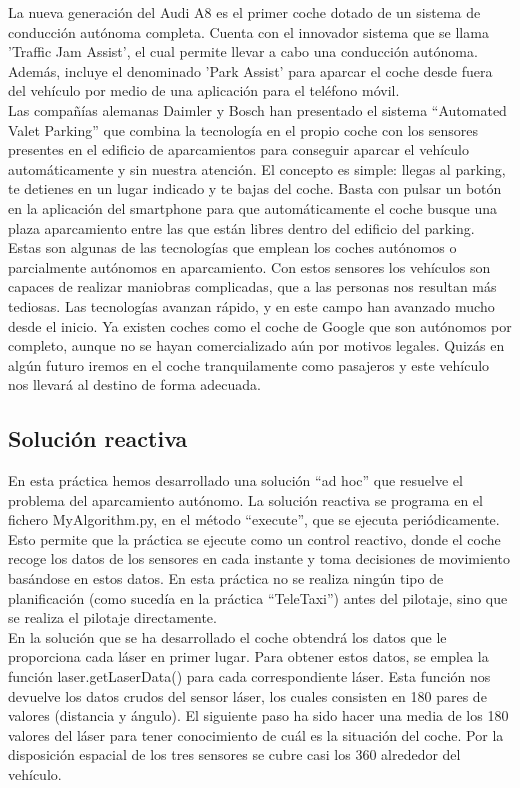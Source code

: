 La nueva generación del Audi A8 es el primer coche dotado de un sistema de conducción autónoma completa. Cuenta con el innovador sistema que se llama 'Traffic Jam Assist', el cual permite llevar a cabo una conducción autónoma. Además, incluye el denominado 'Park Assist' para aparcar el coche desde fuera del vehículo por medio de una aplicación para el teléfono móvil.\\

Las compañías alemanas Daimler y Bosch han presentado el sistema “Automated Valet Parking” que combina la tecnología en el propio coche con los sensores presentes en el edificio de aparcamientos para conseguir aparcar el vehículo automáticamente y sin nuestra atención. El concepto es simple: llegas al parking, te detienes en un lugar indicado y te bajas del coche. Basta con pulsar un botón en la aplicación del smartphone para que automáticamente el coche busque una plaza aparcamiento entre las que están libres dentro del edificio del parking.\\

Estas son algunas de las tecnologías que emplean los coches autónomos o parcialmente autónomos en aparcamiento. Con estos sensores los vehículos son capaces de realizar maniobras complicadas, que a las personas nos resultan más tediosas. Las tecnologías avanzan rápido, y en este campo han avanzado mucho desde el inicio. Ya existen coches como el coche de Google que son autónomos por completo, aunque no se hayan comercializado aún por motivos legales. Quizás en algún futuro iremos en el coche tranquilamente como pasajeros y este vehículo nos llevará al destino de forma adecuada.

\subsection{Solución reactiva}
En esta práctica hemos desarrollado una solución ``ad hoc'' que resuelve el problema del aparcamiento autónomo. La solución reactiva se programa en el fichero MyAlgorithm.py, en el método ``execute'', que se ejecuta periódicamente. Esto permite que la práctica se ejecute como un control reactivo, donde el coche recoge los datos de los sensores en cada instante y toma decisiones de movimiento basándose en estos datos. En esta práctica no se realiza ningún tipo de planificación (como sucedía en la práctica ``TeleTaxi'') antes del pilotaje, sino que se realiza el pilotaje directamente.\\


En la solución que se ha desarrollado el coche obtendrá los datos que le proporciona cada láser en primer lugar. Para obtener estos datos, se emplea la función laser.getLaserData() para cada correspondiente láser. Esta función nos devuelve los datos crudos del sensor láser, los cuales consisten en 180 pares de valores (distancia y ángulo). El siguiente paso ha sido hacer una media de los 180 valores del láser para tener conocimiento de cuál es la situación del coche. Por la disposición espacial de los tres sensores se cubre casi los 360 alrededor del vehículo.\\

